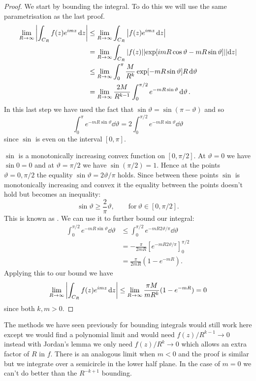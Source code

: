 \documentclass{article}
\begin{document}
    \begin{proof}
        We start by bounding the integral.
        To do this we will use the same parametrisation as the last proof.
        \begin{align*}
            \lim_{R\to\infty} \abs{\int_{C_R} f(z)e^{imz}\dd{z}} &\le \lim_{R\to\infty} \int_{C_R} \abs{f(z)e^{imz}\dd{z}}\\
            &= \lim_{R\to\infty} \int_{C_R} \abs{f(z)} \abs{\exp[imR\cos\vartheta - mR\sin\vartheta]}\abs{\dd{z}}\\
            &\le \lim_{R\to\infty} \int_{0}^{\pi} \frac{M}{R^{k}}\exp[-mR\sin\vartheta]R\dd{\vartheta}\\
            &= \lim_{R\to\infty} \frac{2M}{R^{k-1}} \int_{0}^{\pi/2} e^{-mR\sin\vartheta}\dd{\vartheta}.
        \end{align*}
        In this last step we have used the fact that \(\sin\vartheta = \sin(\pi - \vartheta)\) and so
        \[\int_{0}^{\pi} e^{-mR\sin\vartheta} \dd{\vartheta} = 2\int_{0}^{\pi/2} e^{-mR\sin\vartheta}\dd{\vartheta}\]
        since \(\sin\) is even on the interval \([0, \pi]\).
        
        \(\sin\) is a monotonically increasing convex function on \([0, \pi/2]\).
        At \(\vartheta = 0\) we have \(\sin 0 = 0\) and at \(\vartheta = \pi/2\) we have \(\sin(\pi/2) = 1\).
        Hence at the points \(\vartheta = 0, \pi/2\) the equality \(\sin\vartheta = 2\vartheta/\pi\) holds.
        Since between these points \(\sin\) is monotonically increasing and convex it the equality between the points doesn't hold but becomes an inequality:
        \[\sin\vartheta \ge \frac{2}{\pi}\vartheta, \qquad\text{for}~\vartheta\in[0, \pi/2].\]
        This is known as .
        We can use it to further bound our integral:
        \begin{align*}
            \int_{0}^{\pi/2} e^{-mR\sin\vartheta} \dd{\vartheta} &\le \int_{0}^{\pi/2} e^{-mR2\vartheta/\pi} \dd{\vartheta}\\
            &= -\frac{\pi}{2mR}[e^{-mR2\vartheta/\pi}]_{0}^{\pi/2}\\
            &= \frac{\pi}{2mR}(1 - e^{-mR}).
        \end{align*}
        Applying this to our bound we have
        \[\lim_{R\to\infty} \abs{\int_{C_R} f(z)e^{imz}\dd{z}} \le \lim_{R\to\infty} \frac{\pi M}{mR^k}(1 - e^{-mR}) = 0\]
        since both \(k, m > 0\).
    \end{proof}
    The methods we have seen previously for bounding integrals would still work here except we would find a polynomial limit and would need \(f(z)/R^{k-1} \to 0\) instead with Jordan's lemma we only need \(f(z)/R^{k} \to 0\) which allows an extra factor of \(R\) in \(f\).
    There is an analogous limit when \(m < 0\) and the proof is similar but we integrate over a semicircle in the lower half plane.
    In the case of \(m = 0\) we can't do better than the \(R^{-k+1}\) bounding.
    
\end{document}
